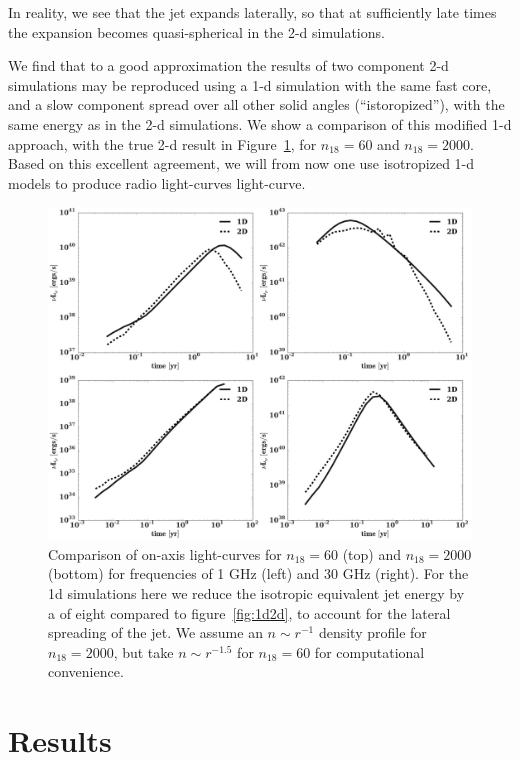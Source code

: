 \documentclass[usenatbib,fleqn]{mnras}
\begin{document}
In reality, we see that the jet expands laterally, so that at
sufficiently late times the expansion becomes quasi-spherical in the
2-d simulations.

We find that to a good approximation the results of two component 2-d
simulations may be reproduced using a 1-d simulation with the same
fast core, and a slow component spread over all other solid angles
(``istoropized''), with the same energy as in the 2-d simulations.  We
show a comparison of this modified 1-d approach, with the true 2-d
result in Figure~\ref{fig:1d2dB}, for $n_{18}=60$ and $n_{18}=2000$.
Based on this excellent agreement, we will from now one use
  isotropized 1-d models to produce radio light-curves light-curve.

\begin{figure}
\includegraphics[width=16cm]{1d_2d.pdf}
\caption{\label{fig:1d2dB} Comparison of on-axis light-curves for
  $n_{18}=60$ (top) and $n_{18}=2000$ (bottom) for frequencies of 1
  GHz (left) and 30 GHz (right). For the 1d simulations here we reduce
  the isotropic equivalent jet energy by a of eight compared to
  figure~\ref{fig:1d2d}, to account for the lateral spreading of the
  jet. We assume an $n\sim r^{-1}$ density profile for $n_{18}=2000$, but
  take $n\sim r^{-1.5}$ for $n_{18}=60$ for computational convenience.}
\end{figure}


\section{Results}
\label{sec:results}
\end{document}

